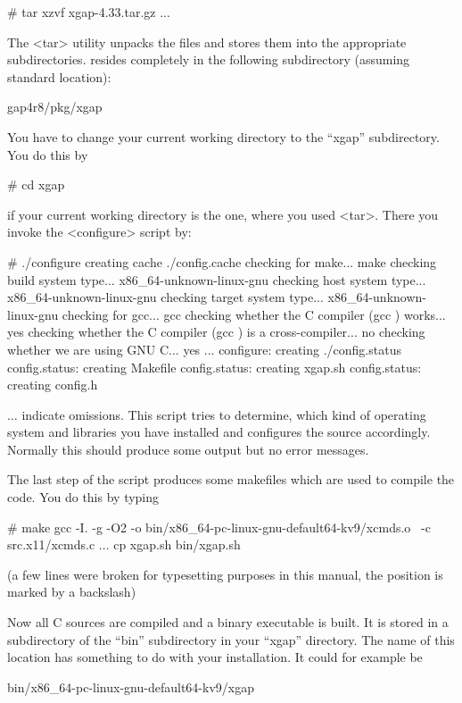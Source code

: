 \begintt
# tar xzvf xgap-4.33.tar.gz
...
\endtt

The <tar> utility unpacks the files and stores them into the appropriate
subdirectories. {\XGAP} resides completely in the following subdirectory
(assuming standard location):

\begintt
gap4r8/pkg/xgap
\endtt


You have to change your current working directory to the ``xgap''
subdirectory. You do this by

\begintt
# cd xgap
\endtt

if your current working directory is the one, where you used
<tar>. There you invoke the <configure> script by:

\begintt
# ./configure
creating cache ./config.cache
checking for make... make
checking build system type... x86_64-unknown-linux-gnu
checking host system type... x86_64-unknown-linux-gnu
checking target system type... x86_64-unknown-linux-gnu
checking for gcc... gcc
checking whether the C compiler (gcc  ) works... yes
checking whether the C compiler (gcc  ) is a cross-compiler... no
checking whether we are using GNU C... yes
...
configure: creating ./config.status
config.status: creating Makefile
config.status: creating xgap.sh
config.status: creating config.h
\endtt

$\ldots$ indicate omissions. 
This script tries to determine, which kind of operating system and
libraries you have installed and configures the source
accordingly. Normally this should produce some output but no error
messages. 

The last step of the script produces some makefiles which are
used to compile the code. You do this by typing

\begintt
# make
gcc -I. -g -O2 -o bin/x86_64-pc-linux-gnu-default64-kv9/xcmds.o \
     -c src.x11/xcmds.c
...
cp xgap.sh bin/xgap.sh
\endtt

(a few lines were broken for typesetting purposes in this manual, the
position is marked by a backslash) 

Now all C sources are compiled and a binary executable is built. It is
stored in a subdirectory of the ``bin'' subdirectory in your ``xgap''
directory. The name of this location has something to do with your
installation. It could for example be

\begintt
bin/x86_64-pc-linux-gnu-default64-kv9/xgap
\endtt


